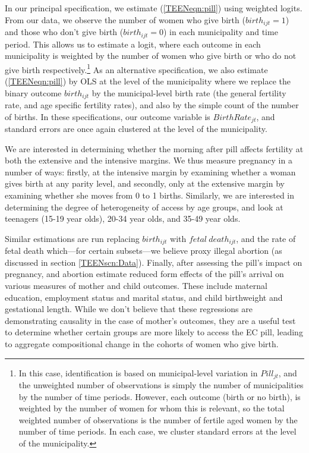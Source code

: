 In our principal specification, we estimate (\ref{TEENeqn:pill}) using weighted
logits.  From our data, we observe the number of women who give birth 
($birth_{ijt}=1$) and those who don't give birth ($birth_{ijt}=0$) in each 
municipality and time period.  This allows us to estimate a logit, where each 
outcome in each municipality is weighted by the number of women who give birth 
or who do not give birth respectively.\footnote{In this case, identification is
based on municipal-level variation in $Pill_{jt}$, and the unweighted number of
observations is simply the number of municipalities by the number of time 
periods.  However, each outcome (birth or no birth), is weighted by the number
of women for whom this is relevant, so the total weighted number of observations 
is the number of fertile aged women by the number of time periods. In each case,
we cluster standard errors at the level of the municipality.} As an alternative
specification, we also estimate (\ref{TEENeqn:pill}) by OLS at the level of 
the municipality where we replace the binary outcome $birth_{ijt}$ by the 
municipal-level birth rate (the general fertility rate, and age specific 
fertility rates), and also by the simple count of the number of births. In 
these specifications, our outcome variable is $BirthRate_{jt}$, and standard 
errors are once again clustered at the level of the municipality.

We are interested in determining whether the morning after pill affects 
fertility at both the extensive and the intensive margins.  We thus measure
pregnancy in a number of ways: firstly, at the intensive margin by examining
whether a woman gives birth at any parity level, and secondly, only at the
extensive margin by examining whether she moves from 0 to 1 births. Similarly, 
we are interested in determining the degree of heterogeneity of access by age 
groups, and look at teenagers (15-19 year olds), 20-34 year olds, and 35-49 
year olds. 

Similar estimations are run replacing $birth_{ijt}$ with $fetal\ death_{ijt}$,
and the rate of fetal death which---for certain subsets---we believe proxy 
illegal abortion (as discussed in section \ref{TEENscn:Data}).  Finally, after 
assessing the pill's impact on pregnancy, and abortion \person estimate reduced 
form effects of the pill's arrival on various measures of mother and child 
outcomes.  These include maternal education, employment status and marital 
status, and child birthweight and gestational length.  While we don't believe 
that these regressions are demonstrating causality in the case of mother's 
outcomes, they are a useful test to determine whether certain groups are more 
likely to access the EC pill, leading to aggregate compositional change in the 
cohorts of women who give birth.


